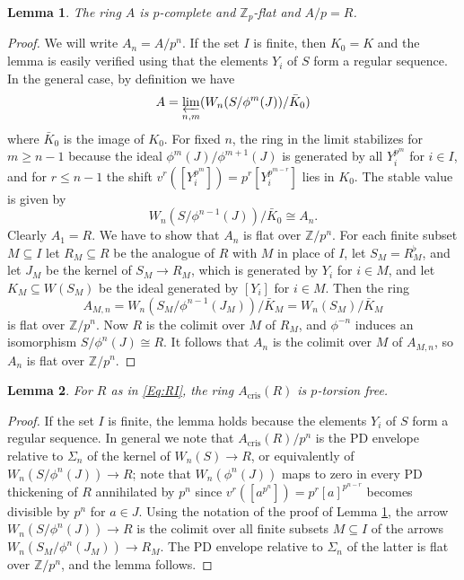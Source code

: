 \documentclass[a4paper,11pt]{article}
\theoremstyle{plain}
\newtheorem{Lemma}{Lemma}
\theoremstyle{definition}
\theoremstyle{remark}
\theoremstyle{definition}
\numberwithin{Lemma}{section}
\numberwithin{Subpoint}{Lemma}
\numberwithin{equation}{section}
\newcommand{\ZZ}{{\mathbb{Z}}}
\DeclareMathOperator{\cris}{cris}
\newcommand{\chang}[1]{{#1}}
\begin{document}
\begin{Lemma}
\label{Le:lift-RI}
The ring $A$ is \chang{$p$-complete} and $\ZZ_p$-flat and $A/p=R$.
\end{Lemma}

\begin{proof}
We will write $A_n=A/p^n$.
If the set $I$ is finite, then $K_0=K$ and the lemma is
easily verified using that the elements $Y_i$ of $S$ form a regular sequence.
In the general case,
by definition we have
\[
A=\varprojlim_{n,m}(W_n(S/\phi^m(J))/\bar K_0)
\]
where $\bar K_0$ is the image of $K_0$.
For fixed $n$, the ring in the limit stabilizes for $m\ge n-1$
because the ideal $\phi^m(J)/\phi^{m+1}(J)$ is generated by all
$Y_i^{p^m}$ for $i\in I$, and for $r\le n-1$ the shift
$v^r([Y_i^{p^m}])=p^r[Y_i^{p^{m-r}}]$ lies in $K_0$.
The stable value is given by
\[
W_n(S/\phi^{n-1}(J))/\bar K_0\cong A_n.
\]
Clearly $A_1=R$. We have to show that $A_n$ is flat over $\ZZ/p^n$.
For each finite subset $M\subseteq I$ let $R_M\subseteq R$
be the analogue of $R$ with $M$ in place of $I$,
let $S_M=R_M^\flat$, and let $J_M$ be the kernel of $S_M\to R_M$,
which is generated by $Y_i$ for $i\in M$,
and let $K_M\subseteq W(S_M)$ be the ideal generated by $[Y_i]$ for $i\in M$.
Then the ring
\[
A_{M,n}=W_n(S_M/\phi^{n-1}(J_M))/\bar K_M=W_n(S_M)/\bar K_M
\]
is flat over $\ZZ/p^n$. 
Now $R$ is the colimit over $M$ of $R_M$,
and $\phi^{-n}$ induces an isomorphism $S/\phi^n(J)\cong R$.
It follows that $A_n$ is the colimit over $M$ of $A_{M,n}$, 
so $A_n$ is flat over $\ZZ/p^n$.
\end{proof}

\begin{Lemma}
\label{Le:Acris-RI}
\chang{For $R$ as in \eqref{Eq:RI},} the ring $A_{\cris}(R)$ is $p$-torsion free.
\end{Lemma}

\begin{proof}
If the set $I$ is finite, the lemma holds because the
elements $Y_i$ of $S$ form a regular sequence.
In general we note that $A_{\cris}(R)/p^n$ is the PD envelope
relative to $\Sigma_n$ of the kernel of $W_n(S)\to R$,
or equivalently of $W_n(S/\phi^n(J))\to R$; 
note that $W_n(\phi^n(J))$ maps to zero 
in every PD thickening of $R$ annihilated by $p^n$
since $v^r([a^{p^n}])=p^r[a]^{p^{n-r}}$ becomes divisible by $p^n$ for $a\in J$. 
Using the notation of the proof of Lemma \ref{Le:lift-RI},
the arrow $W_n(S/\phi^n(J))\to R$ is the colimit over all
finite subsets $M\subseteq I$ of the arrows $W_n(S_M/\phi^n(J_M))\to R_M$.
The PD envelope relative to $\Sigma_n$ of the latter 
is flat over $\ZZ/p^n$, and the lemma follows.
\end{proof}
\end{document}
